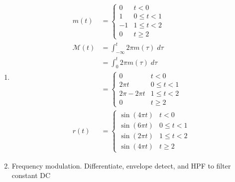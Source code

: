 \documentclass[12pt]{article}
\newcommand{\M}{\mathcal{M}}
\begin{document}
\begin{enumerate}
    \item \begin{align*}
        m(t) &= \begin{cases}
                0 & t < 0\\
                1 & 0 \leq t < 1\\ 
                -1 & 1 \leq t < 2\\ 
                0 & t \geq 2
        \end{cases}\\ 
        \M(t) &= \int_{-\infty}^t 2\pi m(\tau)\; d\tau\\ 
        &= \int_0^t 2\pi m(\tau )\; d\tau\\ 
        &= \begin{cases}
            0 & t < 0\\ 
            2\pi t & 0 \leq t < 1\\ 
            2\pi - 2\pi t & 1 \leq t < 2\\ 
            0 & t \geq 2
        \end{cases}\\ 
        r(t) &= \begin{cases}
            \sin(4\pi t) & t < 0\\ 
            \sin(6\pi t) & 0 \leq t < 1\\ 
            \sin(2\pi t) & 1 \leq t < 2\\ 
            \sin (4\pi t) & t \geq 2
        \end{cases}
    \end{align*}

    \item Frequency modulation. Differentiate, envelope detect, and HPF to filter constant DC

\end{enumerate}
\end{document}
